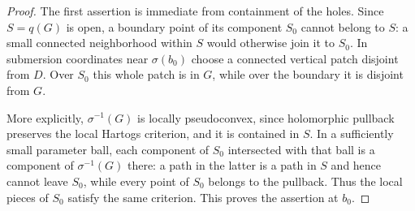 \begin{proof}
The first assertion is immediate from containment of the holes.
Since $S=q(G)$ is open, a boundary point of its component $S_0$
cannot belong to $S$: a small connected neighborhood within $S$
would otherwise join it to $S_0$. In submersion coordinates near
$\sigma(b_0)$ choose a connected vertical patch disjoint from
$D$. Over $S_0$ this whole patch is in $G$, while over the
boundary it is disjoint from $G$.

More explicitly, $\sigma^{-1}(G)$ is locally pseudoconvex, since
holomorphic pullback preserves the local Hartogs criterion, and
it is contained in $S$. In a sufficiently small parameter ball,
each component of $S_0$ intersected with that ball is a component
of $\sigma^{-1}(G)$ there: a path in the latter is a path in $S$
and hence cannot leave $S_0$, while every point of $S_0$ belongs
to the pullback. Thus the local pieces of $S_0$ satisfy the same
criterion. This proves the assertion at $b_0$.
\end{proof}
